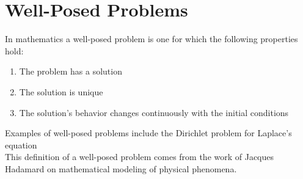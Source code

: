 \documentclass[]{article}
\begin{document}







\section{Well-Posed Problems}
In mathematics a well-posed problem is one for 
which the following properties hold:

\begin{enumerate}
        \item The problem has a solution
        \item The solution is unique
        \item The solution's behavior changes continuously with the initial conditions
\end{enumerate}
Examples of well-posed problems include the Dirichlet problem for Laplace's equation
\\
This definition of a well-posed problem comes from the work of Jacques Hadamard on mathematical modeling of physical phenomena.
\end{document}
